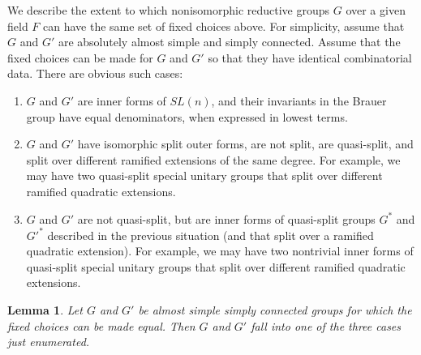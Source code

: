 \documentclass[12pt]{amsart}
\theoremstyle{plain}
\newtheorem{lem}[thm]{Lemma}
\theoremstyle{definition}
\begin{document}
We describe the extent to which nonisomorphic reductive groups $G$
over a given field $F$ can have the same set of fixed choices above.
For simplicity, assume that $G$ and $G'$ are absolutely almost simple
and simply connected.  Assume that the fixed choices can be made for
$G$ and $G'$ so that they have identical combinatorial data.  There
are obvious such cases:
\begin{enumerate}
\item $G$ and $G'$ are inner forms of $SL(n)$, and their invariants in
  the Brauer group have equal denominators, when expressed in lowest terms.
\item $G$ and $G'$ have isomorphic split outer forms, are not split,
  are quasi-split, and split over different ramified
  extensions of the same degree.  For example, we may have two
  quasi-split special unitary groups that split over different
  ramified quadratic extensions.
\item $G$ and $G'$ are not quasi-split, but are inner forms of
  quasi-split groups $G^*$ and $G'^{*}$ described in the previous
  situation (and that split over a ramified quadratic extension).  
  For example, we may have two nontrivial inner forms of
  quasi-split special unitary groups that split over different
  ramified quadratic extensions.
\end{enumerate}

\begin{lem} Let $G$ and $G'$ be almost simple simply connected groups
  for which the fixed choices can be made equal.  Then $G$ and $G'$
  fall into one of the three cases just enumerated.
\end{lem}
\end{document}
